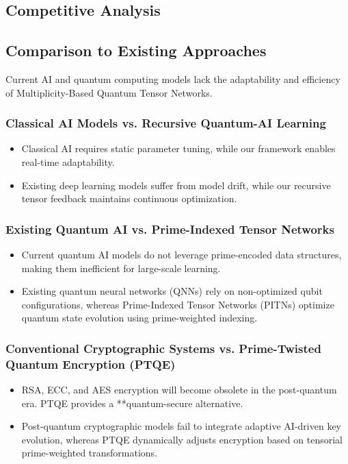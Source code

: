\documentclass{article}
\theoremstyle{plain}
\begin{document}
\begin{itemize}
\begin{itemize}
\section{Competitive Analysis}

\subsection{Comparison to Existing Approaches}
Current AI and quantum computing models lack the adaptability and efficiency of Multiplicity-Based Quantum Tensor Networks.

\subsubsection{Classical AI Models vs. Recursive Quantum-AI Learning}
\begin{itemize}
    \item Classical AI requires static parameter tuning, while our framework enables real-time adaptability.
    \item Existing deep learning models suffer from model drift, while our recursive tensor feedback maintains continuous optimization.
\end{itemize}

\subsubsection{Existing Quantum AI vs. Prime-Indexed Tensor Networks}
\begin{itemize}
    \item Current quantum AI models do not leverage prime-encoded data structures, making them inefficient for large-scale learning.
    \item Existing quantum neural networks (QNNs) rely on non-optimized qubit configurations, whereas Prime-Indexed Tensor Networks (PITNs) optimize quantum state evolution using prime-weighted indexing.
\end{itemize}

\subsubsection{Conventional Cryptographic Systems vs. Prime-Twisted Quantum Encryption (PTQE)}
\begin{itemize}
    \item RSA, ECC, and AES encryption will become obsolete in the post-quantum era. PTQE provides a **quantum-secure alternative.
    \item Post-quantum cryptographic models fail to integrate adaptive AI-driven key evolution, whereas PTQE dynamically adjusts encryption based on tensorial prime-weighted transformations.
\end{itemize}


\end{itemize}
\end{itemize}
\end{document}
